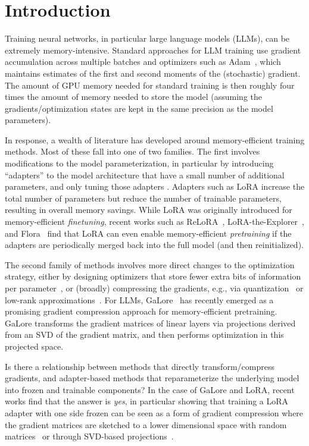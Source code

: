 \section{Introduction}

Training neural networks, in particular large language models (LLMs), can be extremely memory-intensive.
Standard approaches for LLM training use gradient accumulation across multiple batches and optimizers such as Adam~\citep{adam}, which maintains estimates of the first and second moments of the (stochastic) gradient. 
The amount of GPU memory needed for standard training is then roughly four times the amount of memory needed to store the model (assuming  the gradients/optimization states are kept in the same precision as the model parameters).



In response, a wealth of literature has developed around  memory-efficient training methods.
Most of these fall into one of two families.
The first involves modifications to the model parameterization, in particular by introducing ``adapters'' to the model architecture that have a small number of additional parameters, and only tuning those adapters \citep{houlsby2019parameter, li-liang-2021-prefix,lora}.  
Adapters such as LoRA increase the total number of  parameters but reduce the number of trainable parameters, resulting in overall memory savings.
While LoRA was originally introduced for memory-efficient \emph{finetuning}, recent works such as ReLoRA~\citep{relora}, LoRA-the-Explorer~\citep[LTE;][]{lte}, and Flora~\citep{hao2024flora} find that LoRA can even enable memory-efficient \emph{pretraining} if the adapters are periodically merged back into the full model (and then reinitialized).


The second family of methods involves more direct changes to the optimization strategy, either by designing optimizers that store fewer extra bits of information per parameter~\citep{anil2019memory, adafactor}, or (broadly) compressing the gradients, e.g., via quantization~\citep{signsgd, adam8bit,li2024memory} or low-rank approximations~\citep{gooneratne2020low,huang2023low}. 
For LLMs, GaLore~\citep{galore} has recently emerged as a promising gradient compression approach for memory-efficient pretraining. GaLore transforms the gradient matrices of linear layers via projections derived from an SVD of the gradient matrix, and then performs optimization in this projected space. 

Is there a relationship between methods that directly transform/compress gradients, and adapter-based methods that reparameterize the underlying model into frozen and trainable components? In the case of GaLore and LoRA, recent works find that the answer is \emph{yes}, in particular showing that training a LoRA adapter with one side frozen can be seen  as a form of gradient compression where the gradient matrices are {sketched} to a lower dimensional space with random matrices~\citep{hao2024flora} or through SVD-based projections~\citep{loeschckeloqt}. 




